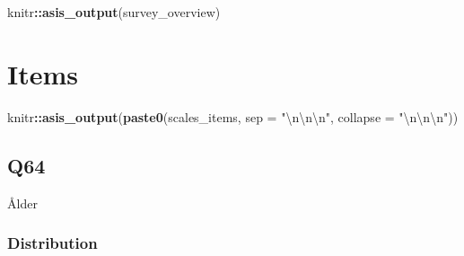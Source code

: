\documentclass[]{book}
\newenvironment{Shaded}{\begin{snugshade}}{\end{snugshade}}
\newcommand{\KeywordTok}[1]{\textcolor[rgb]{0.13,0.29,0.53}{\textbf{#1}}}
\newcommand{\DataTypeTok}[1]{\textcolor[rgb]{0.13,0.29,0.53}{#1}}
\newcommand{\CharTok}[1]{\textcolor[rgb]{0.31,0.60,0.02}{#1}}
\newcommand{\StringTok}[1]{\textcolor[rgb]{0.31,0.60,0.02}{#1}}
\newcommand{\OperatorTok}[1]{\textcolor[rgb]{0.81,0.36,0.00}{\textbf{#1}}}
\newcommand{\NormalTok}[1]{#1}
\begin{document}
\begin{Shaded}
\begin{Highlighting}[]
\NormalTok{knitr}\OperatorTok{::}\KeywordTok{asis_output}\NormalTok{(survey_overview)}
\end{Highlighting}
\end{Shaded}

\section{Items}\label{items}

\begin{Shaded}
\begin{Highlighting}[]
\NormalTok{knitr}\OperatorTok{::}\KeywordTok{asis_output}\NormalTok{(}\KeywordTok{paste0}\NormalTok{(scales_items, }\DataTypeTok{sep =} \StringTok{"}\CharTok{\textbackslash{}n\textbackslash{}n\textbackslash{}n}\StringTok{"}\NormalTok{, }\DataTypeTok{collapse =} \StringTok{"}\CharTok{\textbackslash{}n\textbackslash{}n\textbackslash{}n}\StringTok{"}\NormalTok{))}
\end{Highlighting}
\end{Shaded}

\subsection{Q64}\label{Q64}

Ålder

\subsubsection{Distribution}\label{Q64_distribution}
\end{document}
